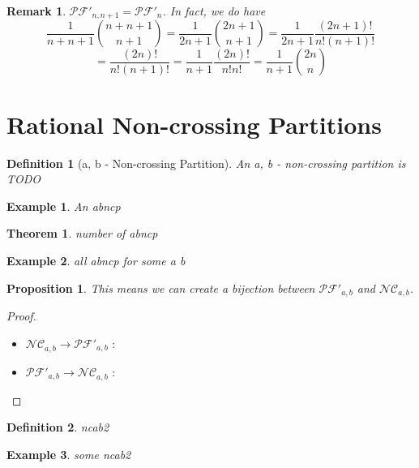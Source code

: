 \documentclass[12pt]{report}
\newtheorem{theorem}{Theorem}
\newtheorem*{prop}{Proposition}
\newtheorem{definition}{Definition}
\newtheorem*{example}{Example}
\newtheorem*{rem}{Remark}
\begin{document}
\begin{rem}
    $\mathcal{PF'}_{n,n+1} = \mathcal{PF'}_n$.
    In fact, we do have
    $$\frac{1}{n + n + 1} \binom{n + n + 1}{n + 1}
    = \frac{1}{2n + 1} \binom {2n + 1}{n + 1}
    = \frac{1}{2n + 1} \frac{(2n + 1)!}{n ! (n+1)!}$$
    $$= \frac{(2n)!}{n!(n+1)!}
    = \frac{1}{n+1} \frac{(2n)!}{n!n!}
    = \frac{1}{n+1} \binom{2n}{n}$$
\end{rem}

\section{Rational Non-crossing Partitions}



\begin{definition}[a, b - Non-crossing Partition]
    An \emph{a, b - non-crossing partition} is
    TODO
\end{definition}

\begin{example}
    An abncp
\end{example}

\begin{theorem}
    number of abncp
\end{theorem}

\begin{example}
    all abncp for some a b
\end{example}

\begin{prop}
    This means we can create a \emph{bijection} between
    $\mathcal{PF'}_{a,b}$ and $\mathcal{NC}_{a,b}$.
\end{prop}

\begin{proof}
    ~\\
\begin{itemize}
    \item $\mathcal{NC}_{a,b} \to \mathcal{PF'}_{a,b}$ :
    
    \item $\mathcal{PF'}_{a,b} \to \mathcal{NC}_{a,b}$ :
\end{itemize}
\end{proof}

\begin{definition}
    ncab2
\end{definition}

\begin{example}
    some ncab2
\end{example}
\end{document}
